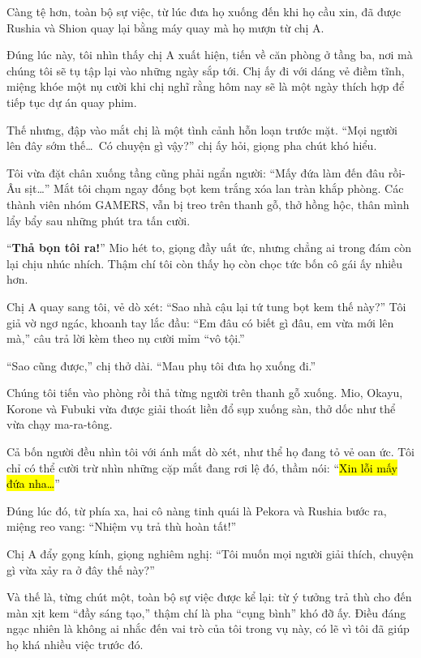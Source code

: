 \documentclass[../main.tex]{subfiles}
\begin{document}
Càng tệ hơn, toàn bộ sự việc, từ lúc đưa họ xuống đến khi họ cầu xin, đã được Rushia và Shion quay lại bằng máy quay mà họ mượn từ chị A.

\ct


Đúng lúc này, tôi nhìn thấy chị A xuất hiện, tiến về căn phòng ở tầng ba, nơi mà chúng tôi sẽ tụ tập lại vào những ngày sắp tới. Chị ấy đi với dáng vẻ điềm tĩnh, miệng khóe một nụ cười khi chị nghĩ rằng hôm nay sẽ là một ngày thích hợp để tiếp tục dự án quay phim.

Thế nhưng, đập vào mắt chị là một tình cảnh hỗn loạn trước mặt. ``Mọi người lên đây sớm thế\dots\ Có chuyện gì vậy?'' chị ấy hỏi, giọng pha chút khó hiểu.

Tôi vừa đặt chân xuống tầng cũng phải ngẩn người: ``Mấy đứa làm đến đâu rồi- Âu sịt\dots'' Mắt tôi chạm ngay đống bọt kem trắng xóa lan tràn khắp phòng. Các thành viên nhóm GAMERS, vẫn bị treo trên thanh gỗ, thở hồng hộc, thân mình lẩy bẩy sau những phút tra tấn cười.

``\textbf{Thả bọn tôi ra!}'' Mio hét to, giọng đầy uất ức, nhưng chẳng ai trong đám còn lại chịu nhúc nhích. Thậm chí tôi còn thấy họ còn chọc tức bốn cô gái ấy nhiều hơn.

Chị A quay sang tôi, vẻ dò xét: ``Sao nhà cậu lại tứ tung bọt kem thế này?'' Tôi giả vờ ngơ ngác, khoanh tay lắc đầu: ``Em đâu có biết gì đâu, em vừa mới lên mà,'' câu trả lời kèm theo nụ cười mỉm ``vô tội.''

``Sao cũng được,'' chị thở dài. ``Mau phụ tôi đưa họ xuống đi.''

Chúng tôi tiến vào phòng rồi thả từng người trên thanh gỗ xuống. Mio, Okayu, Korone và Fubuki vừa được giải thoát liền đổ sụp xuống sàn, thở dốc như thể vừa chạy ma-ra-tông.

Cả bốn người đều nhìn tôi với ánh mắt dò xét, như thể họ đang tỏ vẻ oan ức. Tôi chỉ có thể cười trừ nhìn những cặp mắt đang rơi lệ đó, thầm nói: ``\hl{Xin lỗi mấy đứa nha\dots}''

Đúng lúc đó, từ phía xa, hai cô nàng tinh quái là Pekora và Rushia bước ra, miệng reo vang: ``Nhiệm vụ trả thù hoàn tất!''

Chị A đẩy gọng kính, giọng nghiêm nghị: ``Tôi muốn mọi người giải thích, chuyện gì vừa xảy ra ở đây thế này?''

Và thế là, từng chút một, toàn bộ sự việc được kể lại: từ ý tưởng trả thù cho đến màn xịt kem ``đầy sáng tạo,'' thậm chí là pha ``cụng bình'' khó đỡ ấy. Điều đáng ngạc nhiên là không ai nhắc đến vai trò của tôi trong vụ này, có lẽ vì tôi đã giúp họ khá nhiều việc trước đó.
\end{document}
